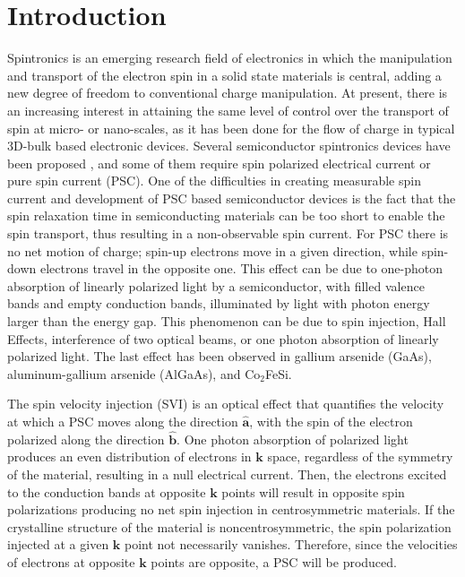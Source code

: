 \documentclass[floatfix,prb,aps,superscriptaddress,showpacs,11pt,preprint,letterpaper]{revtex4}
\begin{document}
\section{Introduction}
\label{sec:introduction}

Spintronics is an emerging research field of electronics in which the
manipulation and transport of the electron spin in a solid state materials  is
central, adding a new degree of freedom to conventional charge
manipulation.\cite{wolfSC04,fabianAPS07} At present, there is an increasing
interest in attaining the same level of control over the transport of spin at
micro- or nano-scales, as it has been done for the flow of charge in typical
3D-bulk based electronic devices.\cite{awschalomNP2007} Several semiconductor
spintronics devices have been proposed \cite{majumdarAPL06,
dattaAPL90,gotteNat16,pershinPRB08}, and some of them require spin polarized
electrical current \cite{awschalomSSBM13} or pure spin current (PSC). One of
the difficulties in creating measurable  spin current and
development of PSC based semiconductor devices is the fact that the spin
relaxation time in semiconducting materials can be too short to enable the
spin transport, thus resulting in a non-observable spin
current.\cite{murakamiSc03} For PSC there is no net motion of charge; spin-up
electrons move in a given direction, while spin-down electrons travel in the
opposite one. This effect can be due to one-photon absorption of linearly
polarized light by a semiconductor, with filled valence bands and empty
conduction bands, illuminated by light with photon energy larger than the
energy gap. This phenomenon can be due to spin injection,\cite{malPRB03} Hall
Effects,\cite{sinovaPRB04} interference of two optical beams,\cite{bhatPRL00,
najmaiePRB03} or one photon absorption of linearly polarized
light\cite{bhatPRL05}. The last effect has been observed in gallium arsenide
(GaAs),\cite{zhaoPRL2006, stevensPRL03} aluminum-gallium arsenide
(AlGaAs),\cite{stevensPRL03} and Co$_2$FeSi.\cite{kimuraNGPAM12}

The spin velocity injection (SVI) is an optical effect that quantifies the velocity at which
a PSC moves along the direction $\hat{\mathbf{a}}$, 
with the spin of the electron polarized along the direction $\hat{\mathbf{b}}$.
One photon absorption of polarized
light produces an even distribution of electrons in $\mathbf{k}$
space, regardless of the symmetry of the material, resulting in a null
electrical current.\cite{bhatPRL05} 
Then, the electrons excited to the
conduction bands at opposite $\mathbf{k}$ points will result in opposite spin
polarizations producing no net spin injection in centrosymmetric 
materials.\cite{bhatPRL05} 
If the crystalline structure of the material
is noncentrosymmetric, the spin polarization injected at a given $\mathbf{k}$
point not necessarily vanishes.\cite{alvaradoPRL85,schmiedeskampPRL88}
Therefore, since the velocities of electrons at opposite $\mathbf{k}$ points
are opposite, a PSC will be produced. 
\end{document}
